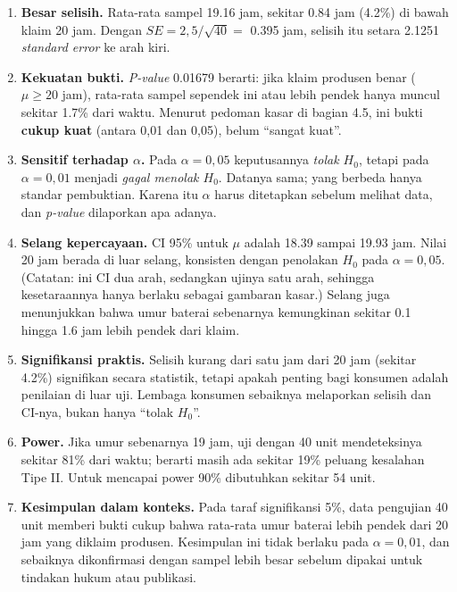 \documentclass[
  indonesian,
  letterpaper,
]{book}
\providecommand{\tightlist}{%
  \setlength{\itemsep}{0pt}\setlength{\parskip}{0pt}}
\begin{document}
\begin{enumerate}
\def\labelenumi{\arabic{enumi}.}
\tightlist
\item
  \textbf{Besar selisih.} Rata-rata sampel 19.16 jam, sekitar 0.84 jam
  (4.2\%) di bawah klaim 20 jam. Dengan \(SE = 2{,}5/\sqrt{40} =\) 0.395
  jam, selisih itu setara 2.1251 \emph{standard error} ke arah kiri.
\item
  \textbf{Kekuatan bukti.} \emph{P-value} 0.01679 berarti: jika klaim
  produsen benar (\(\mu \geq 20\) jam), rata-rata sampel sependek ini
  atau lebih pendek hanya muncul sekitar 1.7\% dari waktu. Menurut
  pedoman kasar di bagian 4.5, ini bukti \textbf{cukup kuat} (antara
  0,01 dan 0,05), belum ``sangat kuat''.
\item
  \textbf{Sensitif terhadap \(\alpha\).} Pada \(\alpha = 0{,}05\)
  keputusannya \emph{tolak \(H_0\)}, tetapi pada \(\alpha = 0{,}01\)
  menjadi \emph{gagal menolak \(H_0\)}. Datanya sama; yang berbeda hanya
  standar pembuktian. Karena itu \(\alpha\) harus ditetapkan sebelum
  melihat data, dan \emph{p-value} dilaporkan apa adanya.
\item
  \textbf{Selang kepercayaan.} CI 95\% untuk \(\mu\) adalah 18.39 sampai
  19.93 jam. Nilai 20 jam berada di luar selang, konsisten dengan
  penolakan \(H_0\) pada \(\alpha = 0{,}05\). (Catatan: ini CI dua arah,
  sedangkan ujinya satu arah, sehingga kesetaraannya hanya berlaku
  sebagai gambaran kasar.) Selang juga menunjukkan bahwa umur baterai
  sebenarnya kemungkinan sekitar 0.1 hingga 1.6 jam lebih pendek dari
  klaim.
\item
  \textbf{Signifikansi praktis.} Selisih kurang dari satu jam dari 20
  jam (sekitar 4.2\%) signifikan secara statistik, tetapi apakah penting
  bagi konsumen adalah penilaian di luar uji. Lembaga konsumen sebaiknya
  melaporkan selisih dan CI-nya, bukan hanya ``tolak \(H_0\)''.
\item
  \textbf{Power.} Jika umur sebenarnya 19 jam, uji dengan 40 unit
  mendeteksinya sekitar 81\% dari waktu; berarti masih ada sekitar 19\%
  peluang kesalahan Tipe II. Untuk mencapai power 90\% dibutuhkan
  sekitar 54 unit.
\item
  \textbf{Kesimpulan dalam konteks.} Pada taraf signifikansi 5\%, data
  pengujian 40 unit memberi bukti cukup bahwa rata-rata umur baterai
  lebih pendek dari 20 jam yang diklaim produsen. Kesimpulan ini tidak
  berlaku pada \(\alpha = 0{,}01\), dan sebaiknya dikonfirmasi dengan
  sampel lebih besar sebelum dipakai untuk tindakan hukum atau
  publikasi.
\end{enumerate}
\end{document}
